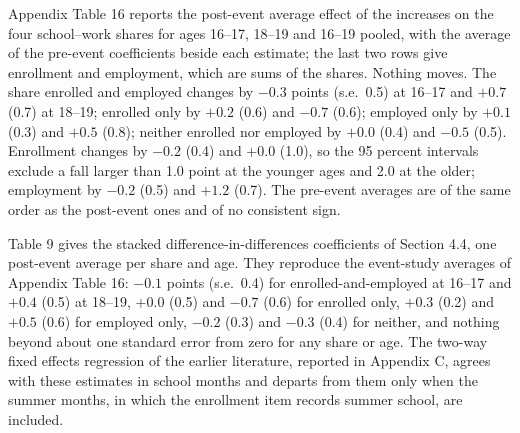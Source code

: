 \documentclass[12pt]{article}
\begin{document}
Appendix Table 16 reports the post-event average effect of the increases on the four school--work shares for ages 16--17, 18--19 and 16--19 pooled, with the average of the pre-event coefficients beside each estimate; the last two rows give enrollment and employment, which are sums of the shares. Nothing moves. The share enrolled and employed changes by $-0.3$ points (s.e.\ 0.5) at 16--17 and $+0.7$ (0.7) at 18--19; enrolled only by $+0.2$ (0.6) and $-0.7$ (0.6); employed only by $+0.1$ (0.3) and $+0.5$ (0.8); neither enrolled nor employed by $+0.0$ (0.4) and $-0.5$ (0.5). Enrollment changes by $-0.2$ (0.4) and $+0.0$ (1.0), so the 95 percent intervals exclude a fall larger than 1.0 point at the younger ages and 2.0 at the older; employment by $-0.2$ (0.5) and $+1.2$ (0.7). The pre-event averages are of the same order as the post-event ones and of no consistent sign.


Table 9 gives the stacked difference-in-differences coefficients of Section 4.4, one post-event average per share and age. They reproduce the event-study averages of Appendix Table 16: $-0.1$ points (s.e.\ 0.4) for enrolled-and-employed at 16--17 and $+0.4$ (0.5) at 18--19, $+0.0$ (0.5) and $-0.7$ (0.6) for enrolled only, $+0.3$ (0.2) and $+0.5$ (0.6) for employed only, $-0.2$ (0.3) and $-0.3$ (0.4) for neither, and nothing beyond about one standard error from zero for any share or age. The two-way fixed effects regression of the earlier literature, reported in Appendix C, agrees with these estimates in school months and departs from them only when the summer months, in which the enrollment item records summer school, are included.
\end{document}

